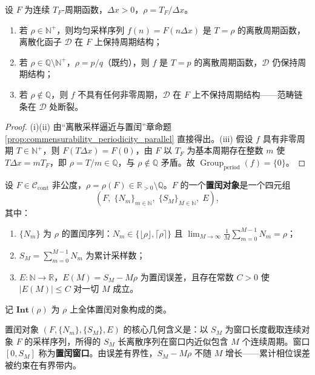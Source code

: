 \begin{proposition}[公度性缺口]\label{prop:commensurability_gap}
设 $F$ 为连续 $T_F$-周期函数，$\Delta x>0$，$\rho = T_F/\Delta x$。
\begin{enumerate}[label=(\roman*)]
    \item 若 $\rho\in\mathbb{N}^+$，则均匀采样序列 $f(n)=F(n\Delta x)$ 是 $T=\rho$ 的离散周期函数，离散化函子 $\mathcal{D}$ 在 $F$ 上保持周期结构；
    \item 若 $\rho\in\mathbb{Q}\setminus\mathbb{N}^+$，$\rho=p/q$（既约），则 $f$ 是 $T=p$ 的离散周期函数，$\mathcal{D}$ 仍保持周期结构；
    \item 若 $\rho\notin\mathbb{Q}$，则 $f$ 不具有任何非零周期，$\mathcal{D}$ 在 $F$ 上不保持周期结构——范畴链条在 $\mathcal{D}$ 处断裂。
\end{enumerate}
\end{proposition}

\begin{proof}
(i)(ii) 由“离散采样逼近与置闰”章命题 \ref{prop:commensurability_periodicity_parallel} 直接得出。(iii) 假设 $f$ 具有非零周期 $T\in\mathbb{N}^+$，则 $F(T\Delta x)=F(0)$，由 $F$ 以 $T_F$ 为基本周期存在整数 $m$ 使 $T\Delta x=mT_F$，即 $\rho=T/m\in\mathbb{Q}$，与 $\rho\notin\mathbb{Q}$ 矛盾。故 $\operatorname{Group}_{\mathrm{period}}(f)=\{0\}$。
\end{proof}

\begin{definition}[置闰对象]\label{def:intercalation_object}
设 $F\in\mathcal{C}_{\text{cont}}$ 非公度，$\rho=\rho(F)\in\mathbb{R}_{>0}\setminus\mathbb{Q}$。$F$ 的一个\textbf{置闰对象}是一个四元组
\[
(F,\;\{N_m\}_{m\in\mathbb{N}},\;\{S_M\}_{M\in\mathbb{N}},\;E),
\]
其中：
\begin{enumerate}[label=(\roman*)]
    \item $\{N_m\}$ 为 $\rho$ 的置闰序列：$N_m\in\{\lfloor\rho\rfloor,\lceil\rho\rceil\}$ 且 $\lim_{M\to\infty}\frac{1}{M}\sum_{m=0}^{M-1}N_m=\rho$；
    \item $S_M=\sum_{m=0}^{M-1}N_m$ 为累计采样数；
    \item $E:\mathbb{N}\to\mathbb{R}$，$E(M)=S_M-M\rho$ 为置闰误差，且存在常数 $C>0$ 使 $|E(M)|\le C$ 对一切 $M$ 成立。
\end{enumerate}
记 $\mathbf{Int}(\rho)$ 为 $\rho$ 上全体置闰对象构成的类。
\end{definition}

\begin{remark}[置闰对象与观测窗口]\label{rem:intercalation_object_window}
置闰对象 $(F,\{N_m\},\{S_M\},E)$ 的核心几何含义是：以 $S_M$ 为窗口长度截取连续对象 $F$ 的采样序列，所得的 $S_M$ 长离散序列在窗口内近似包含 $M$ 个连续周期。窗口 $[0,S_M]$ 称为\textbf{置闰窗口}。由误差有界性，$S_M-M\rho$ 不随 $M$ 增长——累计相位误差被约束在有界带内。
\end{remark}

